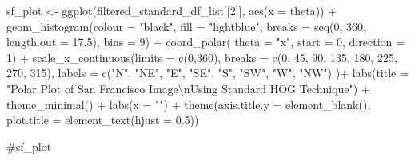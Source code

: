 \documentclass[
  letterpaper,
]{report}
\newenvironment{Shaded}{\begin{snugshade}}{\end{snugshade}}
\newcommand{\AttributeTok}[1]{\textcolor[rgb]{0.40,0.45,0.13}{#1}}
\newcommand{\CommentTok}[1]{\textcolor[rgb]{0.37,0.37,0.37}{#1}}
\newcommand{\DecValTok}[1]{\textcolor[rgb]{0.68,0.00,0.00}{#1}}
\newcommand{\FloatTok}[1]{\textcolor[rgb]{0.68,0.00,0.00}{#1}}
\newcommand{\FunctionTok}[1]{\textcolor[rgb]{0.28,0.35,0.67}{#1}}
\newcommand{\NormalTok}[1]{\textcolor[rgb]{0.00,0.23,0.31}{#1}}
\newcommand{\OtherTok}[1]{\textcolor[rgb]{0.00,0.23,0.31}{#1}}
\newcommand{\SpecialCharTok}[1]{\textcolor[rgb]{0.37,0.37,0.37}{#1}}
\newcommand{\StringTok}[1]{\textcolor[rgb]{0.13,0.47,0.30}{#1}}
\begin{document}
\begin{Shaded}
\begin{Highlighting}[]
\NormalTok{sf\_plot }\OtherTok{\textless{}{-}}
  \FunctionTok{ggplot}\NormalTok{(filtered\_standard\_df\_list[[}\DecValTok{2}\NormalTok{]], }
         \FunctionTok{aes}\NormalTok{(}\AttributeTok{x =}\NormalTok{ theta)) }\SpecialCharTok{+}
  \FunctionTok{geom\_histogram}\NormalTok{(}\AttributeTok{colour =} \StringTok{"black"}\NormalTok{, }
                 \AttributeTok{fill =} \StringTok{"lightblue"}\NormalTok{, }
                 \AttributeTok{breaks =} \FunctionTok{seq}\NormalTok{(}\DecValTok{0}\NormalTok{, }\DecValTok{360}\NormalTok{, }\AttributeTok{length.out =} \FloatTok{17.5}\NormalTok{),}
                 \AttributeTok{bins =} \DecValTok{9}\NormalTok{) }\SpecialCharTok{+}
  \FunctionTok{coord\_polar}\NormalTok{(}
    \AttributeTok{theta =} \StringTok{"x"}\NormalTok{, }
    \AttributeTok{start =} \DecValTok{0}\NormalTok{, }
    \AttributeTok{direction =} \DecValTok{1}\NormalTok{) }\SpecialCharTok{+}
  \FunctionTok{scale\_x\_continuous}\NormalTok{(}\AttributeTok{limits =} \FunctionTok{c}\NormalTok{(}\DecValTok{0}\NormalTok{,}\DecValTok{360}\NormalTok{),}
    \AttributeTok{breaks =} \FunctionTok{c}\NormalTok{(}\DecValTok{0}\NormalTok{, }\DecValTok{45}\NormalTok{, }\DecValTok{90}\NormalTok{, }\DecValTok{135}\NormalTok{, }\DecValTok{180}\NormalTok{, }\DecValTok{225}\NormalTok{, }\DecValTok{270}\NormalTok{, }\DecValTok{315}\NormalTok{), }
    \AttributeTok{labels =} \FunctionTok{c}\NormalTok{(}\StringTok{"N"}\NormalTok{, }\StringTok{"NE"}\NormalTok{, }\StringTok{"E"}\NormalTok{, }\StringTok{"SE"}\NormalTok{, }\StringTok{"S"}\NormalTok{, }\StringTok{"SW"}\NormalTok{, }\StringTok{"W"}\NormalTok{, }\StringTok{"NW"}\NormalTok{)}
\NormalTok{  )}\SpecialCharTok{+}
  \FunctionTok{labs}\NormalTok{(}\AttributeTok{title =} \StringTok{"Polar Plot of San Francisco Image}\SpecialCharTok{\textbackslash{}n}\StringTok{Using Standard HOG Technique"}\NormalTok{) }\SpecialCharTok{+}
  \FunctionTok{theme\_minimal}\NormalTok{() }\SpecialCharTok{+}
  \FunctionTok{labs}\NormalTok{(}\AttributeTok{x =} \StringTok{""}\NormalTok{) }\SpecialCharTok{+}
  \FunctionTok{theme}\NormalTok{(}\AttributeTok{axis.title.y =} \FunctionTok{element\_blank}\NormalTok{(),}
        \AttributeTok{plot.title =} \FunctionTok{element\_text}\NormalTok{(}\AttributeTok{hjust =} \FloatTok{0.5}\NormalTok{))}

\CommentTok{\#sf\_plot}
\end{Highlighting}
\end{Shaded}
\end{document}
